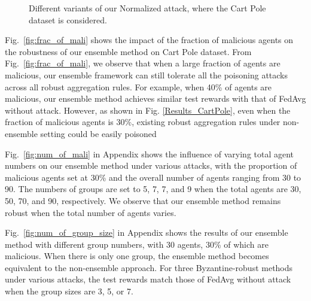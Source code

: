 \begin{figure*}[!t]
	\centering
	\caption{Different variants of our Normalized attack, where the Cart Pole dataset is considered.}
	\label{our_attack_diff_stage}
\end{figure*}






Fig.~\ref{fig:frac_of_mali} shows the impact of the fraction of malicious agents on the robustness of our ensemble method on Cart Pole dataset. 
From Fig.~\ref{fig:frac_of_mali}, we observe that when a large fraction of agents are malicious, our ensemble framework can still tolerate all the poisoning attacks across all robust aggregation rules. 
For example, when 40\% of agents are malicious, our ensemble method achieves similar test rewards with that of FedAvg without attack. 
%
However, as shown in Fig. \ref{Results_CartPole}, even when the fraction of malicious agents is 30\%, existing robust aggregation rules under non-ensemble setting could be easily poisoned



Fig.~\ref{fig:num_of_mali} in Appendix shows the influence of varying total agent numbers on our ensemble method under various attacks, with the proportion of malicious agents set at 30\% and the overall number of agents ranging from 30 to 90.
The numbers of groups are set to 5, 7, 7, and 9 when the total agents are 30, 50, 70, and 90, respectively.
%
We observe that our ensemble method remains robust when the total number of agents varies.



%
%
%
Fig.~\ref{fig:num_of_group_size} in Appendix shows the results of our ensemble method with different group numbers, with 30 agents, 30\% of which are malicious. When there is only one group, the ensemble method becomes equivalent to the non-ensemble approach. For three Byzantine-robust methods under various attacks, the test rewards match those of FedAvg without attack when the group sizes are 3, 5, or 7.






